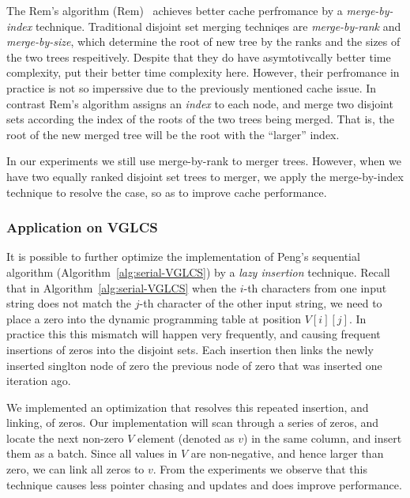 
The Rem's algorithm ({\sc Rem})~\cite{dijkstra1976a} achieves better
cache perfromance by a {\em merge-by-index} technique.  Traditional
disjoint set merging techniqes are {\em merge-by-rank}\cite{XXX} and
{\em merge-by-size}\cite{XXX}, which determine the root of new tree by
the ranks and the sizes of the two trees respeitively.  Despite that
they do have asymtotivcally better time complexity, put their better
time complexity here.  However, their perfromance in practice is not
so imperssive due to the previously mentioned cache issue.  In
contrast Rem's algorithm assigns an {\em index} to each node, and
merge two disjoint sets according the index of the roots of the two
trees being merged.  That is, the root of the new merged tree will be
the root with the ``larger'' index.

In our experiments we still use merge-by-rank to merger trees.
However, when we have two equally ranked disjoint set trees to merger,
we apply the merge-by-index technique to resolve the case, so as to
improve cache performance.

\subsubsection{Application on VGLCS}


It is possible to further optimize the implementation of Peng's
sequential algorithm (Algorithm~\ref{alg:serial-VGLCS}) by a {\em lazy
  insertion} technique.  Recall that in
Algorithm~\ref{alg:serial-VGLCS} when the $i$-th characters from one
input string does not match the $j$-th character of the other input
string, we need to place a zero into the dynamic programming table at
position $V[i][j]$.  In practice this this mismatch will happen very
frequently, and causing frequent insertions of zeros into the disjoint
sets.  Each insertion then links the newly inserted singlton node of
zero the previous node of zero that was inserted one iteration ago. 

We implemented an optimization that resolves this repeated insertion,
and linking, of zeros.  Our implementation will scan through a series
of zeros, and locate the next non-zero $V$ element (denoted as $v$) in
the same column, and insert them as a batch.  Since all values in $V$
are non-negative, and hence larger than zero, we can link all zeros to
$v$.  From the experiments we observe that this technique causes less
pointer chasing and updates and does improve performance.


